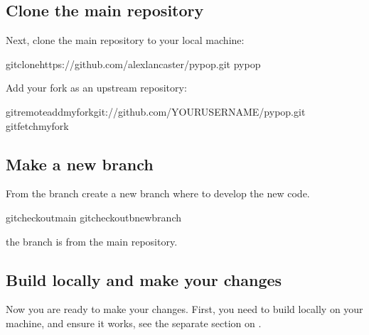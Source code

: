 \documentclass[letterpaper,10pt,english,openany,oneside]{sphinxmanual}
\begin{document}
\subsection{Clone the main repository}
\label{\detokenize{docs/guide-chapter-contributing:clone-the-main-repository}}
\sphinxAtStartPar
Next, clone the main repository to your local machine:

\begin{sphinxVerbatim}[commandchars=\\\{\}]
gitclonehttps://github.com/alexlancaster/pypop.git
pypop
\end{sphinxVerbatim}

\sphinxAtStartPar
Add your fork as an upstream repository:

\begin{sphinxVerbatim}[commandchars=\\\{\}]
gitremoteaddmyforkgit://github.com/YOUR\PYGZhy{}USERNAME/pypop.git
gitfetchmyfork
\end{sphinxVerbatim}


\subsection{Make a new branch}
\label{\detokenize{docs/guide-chapter-contributing:make-a-new-branch}}
\sphinxAtStartPar
From the  branch create a new branch where to develop the new code.

\begin{sphinxVerbatim}[commandchars=\\\{\}]
gitcheckoutmain
gitcheckout\PYGZhy{}bnew\PYGZus{}branch
\end{sphinxVerbatim}

\sphinxAtStartPar
{} the  branch is from the main repository.


\subsection{Build locally and make your changes}
\label{\detokenize{docs/guide-chapter-contributing:build-locally-and-make-your-changes}}
\sphinxAtStartPar
Now you are ready to make your changes.  First, you need to build
 locally on your machine, and ensure it works, see the
separate section on {\hyperref[\detokenize{docs/guide-chapter-contributing:installation-for-developers}]{}}.
\end{document}
